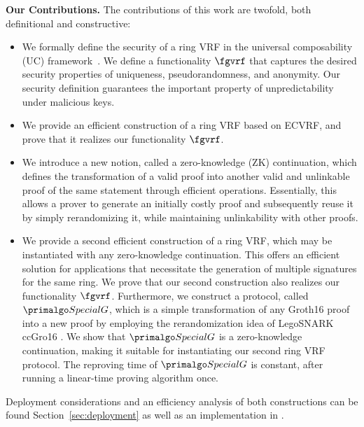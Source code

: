 \medskip
\noindent \textbf{Our Contributions.} The contributions of this work are twofold, both definitional and constructive:
 \begin{itemize}
 	\item We formally define the security of a ring VRF in the universal composability (UC) framework~\cite{canetti1,canetti2}. We define a functionality $ \fgvrf $ that captures the desired security properties of uniqueness, pseudorandomness, and anonymity.  Our security definition guarantees the important property of unpredictability under malicious keys.
	
	\item We provide an efficient construction of a ring VRF based on ECVRF, and prove that it realizes our functionality $ \fgvrf $.  
 	
 	\item We introduce a new notion, called a zero-knowledge (ZK) continuation, which defines the transformation of a valid proof into another valid and unlinkable proof of the same statement through efficient operations.  Essentially, this allows a prover to generate an initially costly proof and subsequently reuse it by simply rerandomizing it,  while maintaining unlinkability with other proofs. 
 	
 	\item  We provide a second efficient construction of a ring VRF, which may be instantiated with any zero-knowledge continuation.
	This offers an efficient solution for applications that necessitate the generation of multiple signatures for the same ring. We prove that our second construction also realizes our functionality $ \fgvrf $.
 	Furthermore, we construct a protocol, called $ \SpecialG $, which  is a simple transformation of any Groth16 proof into a new proof by employing the rerandomization idea of LegoSNARK ccGro16 \cite{LegoSNARK}. We show that $ \SpecialG $ is a zero-knowledge continuation, making it suitable for instantiating our second ring VRF protocol. The reproving time of $ \SpecialG $ is constant, after running a linear-time proving algorithm once.  
	\end{itemize}

Deployment considerations and an efficiency analysis of both constructions can be found Section~\ref{sec:deployment} as well as an implementation in \cite{implementation}.
